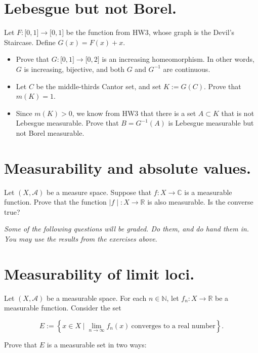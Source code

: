 \section{Lebesgue but not Borel.}

Let \(F:\lbrack 0,1\rbrack\rightarrow\lbrack 0,1\rbrack\) be the function from HW3, whose graph is the Devil's Staircase. Define \(G(x) = F(x) + x\).

\begin{itemize}
\item
  Prove that \(G:\lbrack 0,1\rbrack\rightarrow\lbrack 0,2\rbrack\) is an increasing homeomorphism. In other words, \(G\) is increasing, bijective, and both \(G\) and \(G^{- 1}\) are continuous.
\item
  Let \(C\) be the middle-thirds Cantor set, and set \(K := G(C)\). Prove that \(m(K) = 1\).
\item
  Since \(m(K) > 0\), we know from HW3 that there is a set \(A \subset K\) that is not Lebesgue measurable. Prove that \(B = G^{- 1}(A)\) is Lebesgue measurable but not Borel measurable.
\end{itemize}

\section{Measurability and absolute values.}

Let \((X,\mathcal{A})\) be a measure space. Suppose that \(f:X\rightarrow\mathbb{C}\) is a measurable function. Prove that the function \(\left. |f \middle| :X\rightarrow\mathbb{R} \right.\) is also measurable. Is the converse true?

\emph{Some of the following questions will be graded. Do them, and do hand them in. You may use the results from the exercises above}.

\section{Measurability of limit loci.}

Let \((X,\mathcal{A})\) be a measurable space. For each \(n \in \mathbb{N}\), let \(f_{n}:X\rightarrow\mathbb{R}\) be a measurable function. Consider the set

\[E := \left\{ {x \in X \mid \lim\limits_{n\rightarrow\infty}f_{n}(x)\ \text{converges to a real number}} \right\}.\]

Prove that \(E\) is a measurable set in two ways:

